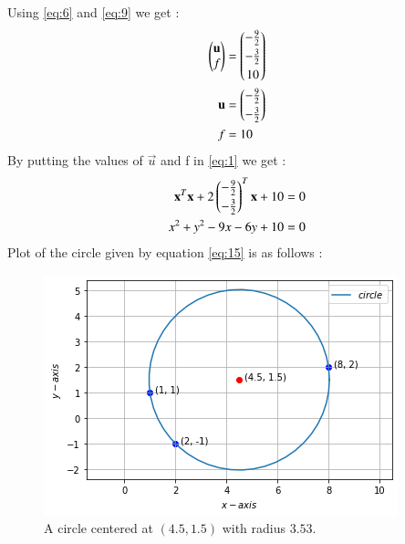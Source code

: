 \documentclass[journal,12pt,twocolumn]{IEEEtran}
\begin{document}
Using \eqref{eq:6} and \eqref{eq:9} we get : 
\begin{align}
\begin{pmatrix}\mathbf{u}\\f\end{pmatrix}&=\begin{pmatrix}-\frac{9}{2}\\[0.1cm]-\frac{3}{2}\\[0.1cm]10\end{pmatrix}\\
\mathbf{u}&=\begin{pmatrix}-\frac{9}{2}\\[0.1cm]-\frac{3}{2}\end{pmatrix}\\
f&=10   
\end{align}
By putting the values of $\vec{u}$ and f in \eqref{eq:1} we get : 
\begin{align}
\mathbf{x}^T\mathbf{x}+2\begin{pmatrix}-\frac{9}{2}\\[0.1cm]-\frac{3}{2}\end{pmatrix}^T\mathbf{x}+10&=0\label{eq:14}\\
x^2+y^2-9x-6y+10&=0\label{eq:15}
\end{align}
Plot of the circle given by equation \eqref{eq:15} is as follows :
\begin{figure}[h]
\centering
    \includegraphics[width=\columnwidth]{circle3.png}
    \caption{A circle centered at $(4.5, 1.5)$ with radius $3.53$.}
    \label{circle}
\end{figure}
\end{document}
